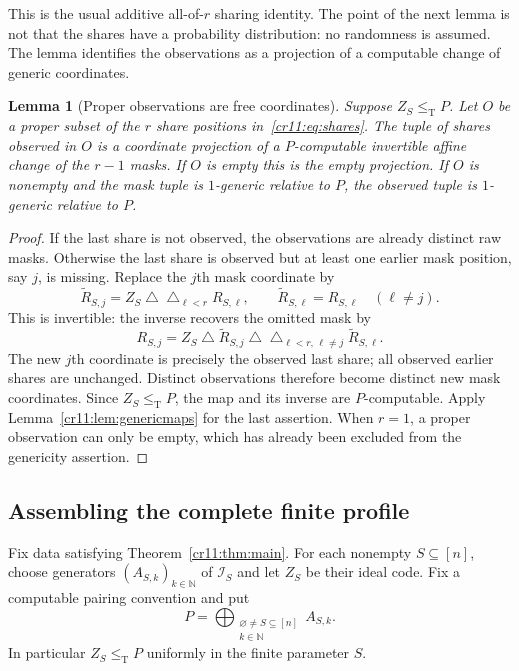 \documentclass[11pt,letterpaper]{article}
\theoremstyle{plain}
\newtheorem{lemma}[theorem]{Lemma}
\theoremstyle{definition}
\theoremstyle{remark}
\numberwithin{equation}{section}
\newcommand{\N}{\mathbb N}
\newcommand{\leT}{\leq_{\mathrm T}}
\newcommand{\bitsum}{\mathbin{\triangle}}
\newcommand{\I}{\mathcal I}
\begin{document}
This is the usual additive all-of-$r$ sharing identity. The point of the
next lemma is not that the shares have a probability distribution: no
randomness is assumed. The lemma identifies the observations as a
projection of a computable change of generic coordinates.

\begin{lemma}[Proper observations are free coordinates]\label{cr11:lem:affine}
Suppose $Z_S\leT P$. Let $O$ be a proper subset of the $r$ share positions
in~\eqref{cr11:eq:shares}. The tuple of shares observed in $O$ is a coordinate
projection of a $P$-computable invertible affine change of the $r-1$ masks.
If $O$ is empty this is the empty projection. If $O$ is nonempty and the
mask tuple is $1$-generic relative to $P$, the observed tuple is
$1$-generic relative to $P$.
\end{lemma}
\begin{proof}
If the last share is not observed, the observations are already distinct
raw masks. Otherwise the last share is observed but at least one earlier
mask position, say $j$, is missing. Replace the $j$th mask coordinate by
\begin{equation}\label{cr11:eq:maskchange}
 \widetilde R_{S,j}=Z_S\bitsum\mathop{\triangle}_{\ell<r}R_{S,\ell},
 \qquad \widetilde R_{S,\ell}=R_{S,\ell}\quad(\ell\ne j).
\end{equation}
This is invertible: the inverse recovers the omitted mask by
\[
 R_{S,j}=Z_S\bitsum\widetilde R_{S,j}
                \bitsum\mathop{\triangle}_{\ell<r,\,\ell\ne j}
                         \widetilde R_{S,\ell}.
\]
The new $j$th coordinate is precisely the observed last share; all observed
earlier shares are unchanged. Distinct observations therefore become
distinct new mask coordinates. Since $Z_S\leT P$, the map and its inverse
are $P$-computable. Apply Lemma~\ref{cr11:lem:genericmaps} for the last assertion.
When $r=1$, a proper observation can only be empty, which has already been
excluded from the genericity assertion.
\end{proof}

\subsection{Assembling the complete finite profile}

Fix data satisfying Theorem~\ref{cr11:thm:main}. For each nonempty
$S\subseteq[n]$, choose generators $(A_{S,k})_{k\in\N}$ of $\I_S$ and let
$Z_S$ be their ideal code. Fix a computable pairing convention and put
\begin{equation}\label{cr11:eq:presentation}
 P=\bigoplus_{\substack{\varnothing\ne S\subseteq[n]\\ k\in\N}} A_{S,k}.
\end{equation}
In particular $Z_S\leT P$ uniformly in the finite parameter $S$.
\end{document}

